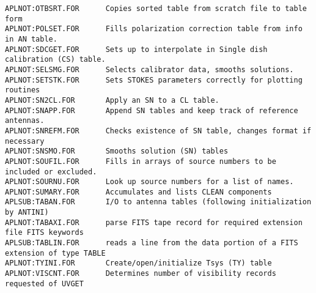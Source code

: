 \begin{verbatim}
APLNOT:OTBSRT.FOR      Copies sorted table from scratch file to table form
APLNOT:POLSET.FOR      Fills polarization correction table from info in AN table.
APLNOT:SDCGET.FOR      Sets up to interpolate in Single dish calibration (CS) table.
APLNOT:SELSMG.FOR      Selects calibrator data, smooths solutions.
APLNOT:SETSTK.FOR      Sets STOKES parameters correctly for plotting routines
APLNOT:SN2CL.FOR       Apply an SN to a CL table.
APLNOT:SNAPP.FOR       Append SN tables and keep track of reference antennas.
APLNOT:SNREFM.FOR      Checks existence of SN table, changes format if necessary
APLNOT:SNSMO.FOR       Smooths solution (SN) tables
APLNOT:SOUFIL.FOR      Fills in arrays of source numbers to be included or excluded.
APLNOT:SOURNU.FOR      Look up source numbers for a list of names.
APLNOT:SUMARY.FOR      Accumulates and lists CLEAN components
APLSUB:TABAN.FOR       I/O to antenna tables (following initialization by ANTINI)
APLNOT:TABAXI.FOR      parse FITS tape record for required extension file FITS keywords
APLSUB:TABLIN.FOR      reads a line from the data portion of a FITS extension of type TABLE
APLNOT:TYINI.FOR       Create/open/initialize Tsys (TY) table
APLNOT:VISCNT.FOR      Determines number of visibility records requested of UVGET
\end{verbatim}
 
